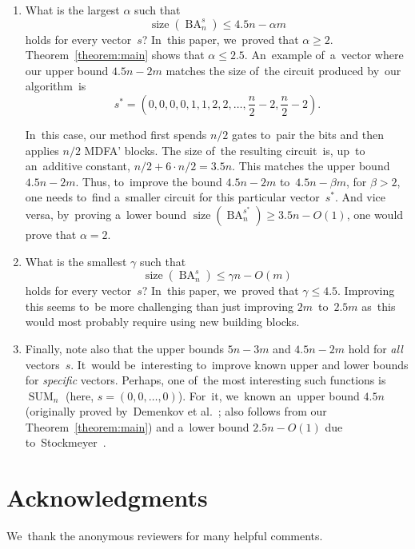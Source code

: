 \documentclass[a4paper, UKenglish, cleveref, autoref,  thm-restate]{lipics-v2021}
\DeclareMathOperator{\SUM}{SUM}
\DeclareMathOperator{\BA}{BA}
\DeclareMathOperator{\size}{size}
\begin{document}
    \begin{enumerate}
        \item What is the largest $\alpha$ such that
        \[\size(\BA_n^s) \le 4.5n-\alpha m\]
        holds for every vector~$s$? In~this paper, we~proved that $\alpha \ge 2$.
        Theorem~\ref{theorem:main} shows that $\alpha \le 2.5$. An~example
        of~a~vector where our upper bound $4.5n-2m$ matches the size of~the circuit
        produced by~our algorithm~is
        \[s^*=\left(0,0,0,0,1,1,2,2,\dotsc,\frac{n}{2}-2, \frac{n}{2}-2\right).\]
        \begin{center}
        \end{center}
        In~this case, our method first spends $n/2$ gates to~pair the bits and then applies $n/2$ MDFA' blocks. The size of~the resulting circuit~is, up~to an~additive constant, $n/2+6\cdot n/2=3.5n$. This matches the upper bound $4.5n-2m$. Thus, to~improve the bound $4.5n-2m$ to~$4.5n-\beta m$, for $\beta > 2$, one needs to~find a~smaller circuit for this particular vector~$s^*$.
        And vice versa, by~proving a~lower bound $\size(\BA_n^{s^*}) \ge 3.5n-O(1)$,
        one would prove that $\alpha=2$.

        \item What is the smallest $\gamma$ such that
        \[\size(\BA_n^s) \le \gamma n-O(m)\]
        holds for every vector~$s$? In~this paper,
        we~proved that $\gamma \le 4.5$.
        Improving this seems to~be more challenging than just improving $2m$~to~$2.5m$ as~this would most probably require using new building blocks.

        \item Finally, note also that the upper bounds $5n-3m$ and $4.5n-2m$ hold for \emph{all} vectors~$s$.
        It~would be~interesting to~improve known upper and lower bounds for \emph{specific} vectors. Perhaps, one of~the most interesting such functions is~$\SUM_n$ (here, $s=(0,0,\dotsc,0)$). For~it, we~known an~upper bound $4.5n$ (originally proved
        by~Demenkov et al.~\cite{DBLP:journals/ipl/DemenkovKKY10}; also follows from our Theorem~\ref{theorem:main}) and a~lower bound $2.5n-O(1)$ due to~Stockmeyer~\cite{DBLP:journals/mst/Stockmeyer77}.
    \end{enumerate}

    \section*{Acknowledgments}
    We~thank the anonymous reviewers for many helpful comments.

    
\end{document}
